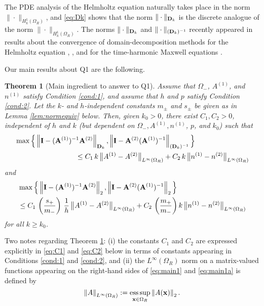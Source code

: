 \documentclass[10pt]{article}%
\newtheorem{theorem}{Theorem}[section]
\numberwithin{equation}{section}
\newcommand{\beqs}{\begin{equation*}}
\newcommand{\eeqs}{\end{equation*}}
\newcommand{\bx}{\mathbf{x}}
\newcommand{\esssup}{\mathop{{\rm ess} \sup}}
\newcommand{\Oi}{{\Omega_-}}
\newcommand{\HoDkk}{{H^1_{k}(\domain_R)}}
\newcommand*{\N}[1]{\left\|#1\right\|}
\newcommand{\domain}{\Omega}
\newcommand{\matrixI}{{\bf I}}
\newcommand{\matrixA}{{\bf A}}
\newcommand{\matrixD}{{\bf D}}
\newcommand{\coeffAo}{A^{(1)}}
\newcommand{\coeffAt}{A^{(2)}}
\newcommand{\coeffno}{n^{(1)}}
\newcommand{\coeffnt}{n^{(2)}}
\begin{document}
The PDE analysis of the Helmholtz equation naturally takes place in the norm $\|\cdot\|_{\HoDkk}$, and \eqref{eq:Dk} shows that the norm $\|\cdot\|_{\matrixD_k}$ is
the discrete analogue of the norm $\|\cdot\|_{\HoDkk}$. %
The norms $\|\cdot\|_{\matrixD_k}$ and $\|\cdot\|_{(\matrixD_k)^{-1}}$ recently appeared in results about the convergence of domain-decomposition methods %
for the Helmholtz equation \cite{GrSpVa:17}, \cite{GrSpZo:18}, and for the time-harmonic Maxwell equations \cite{BoDoGrSpTo:17}. 

Our main results about Q1 are the following.

\begin{theorem}[Main ingredient to answer to Q1]\label{thm:1}
Assume that $\Oi$, $\coeffAo$, and $\coeffno$ satisfy Condition \ref{cond:1}, and assume that $h$ and $p$ satisfy Condition \ref{cond:2}. 
Let the $k$- and $h$-independent constants $m_{\pm}$ and $s_{\pm}$ be given as in Lemma \ref{lem:normequiv} below.
Then, given $k_0>0$, there exist $C_1, C_2>0$, independent of $h$ and $k$ (but dependent on $\Oi, \coeffAo, \coeffno$, $p$, and $k_0$) such that
\begin{align}\nonumber
&\max\Big\{
\N{\matrixI - (\matrixA^{(1)})^{-1}\matrixA^{(2)}}_{\matrixD_k}, 
\N{\matrixI -\matrixA^{(2)} (\matrixA^{(1)})^{-1}}_{(\matrixD_k)^{-1}}
\Big\}\\
&\hspace{3cm} 
\leq C_1 \,k \,
\big\|\coeffAo-\coeffAt\big\|_{L^\infty(\Omega_R)} + C_2 \, k \, \big\|\coeffno-\coeffnt\big\|_{L^\infty(\Omega_R)}
\label{eq:main1}
\end{align}
and 
\begin{align}\nonumber
&\max\Big\{
\N{\matrixI - (\matrixA^{(1)})^{-1}\matrixA^{(2)}}_2, 
\N{\matrixI -\matrixA^{(2)} (\matrixA^{(1)})^{-1}}_2
\Big\}\\
&\hspace{0cm} 
\leq C_1 \,\left(\frac{s_+}{m_-}\right) \,\frac{1}{h} \,
\big\|\coeffAo-\coeffAt\big\|_{L^\infty(\Omega_R)} + C_2 \, \left(\frac{m_+}{m_-} \right)k \, \big\|\coeffno-\coeffnt\big\|_{L^\infty(\Omega_R)}
\label{eq:main1a}
\end{align}
for all $k\geq k_0$. 
\end{theorem}

Two notes regarding Theorem \ref{thm:1}: (i) the constants $C_1$ and $C_2$ are expressed explicitly in \eqref{eq:C1} and \eqref{eq:C2} below in terms of constants appearing in Conditions \ref{cond:1} and \ref{cond:2}, and (ii) the $L^\infty(\Omega_R)$ norm on a matrix-valued functions appearing on the right-hand sides of \eqref{eq:main1} and \eqref{eq:main1a} is defined by
\beqs
\N{A}_{L^\infty(\Omega_R)}:= \esssup_{\bx\in\Omega_R}\N{A(\bx)}_2.
\eeqs
\end{document}

